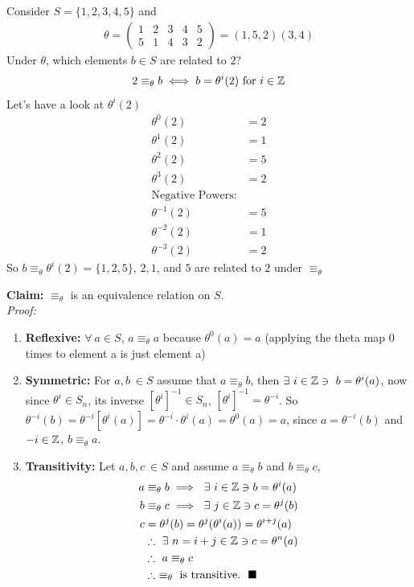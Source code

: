 \begin{example}
Consider $S=\{1,2,3,4,5\}$ and
\begin{align}
    \theta = \begin{pmatrix}
    1&2&3&4&5 \\ 5&1&4&3&2
    \end{pmatrix} = (1,5,2)(3,4)\nonumber
\end{align}
Under $\theta$, which elements $b\in S$ are related to $2$?
\begin{align}
    2\equiv_{\theta} b \iff b=\theta^i(2) \ \text{for } i \in {\mathbb{ Z}} \nonumber
\end{align}
Let's have a look at $\theta^i(2)$
\begin{align}
    \theta^0(2)&=2 \nonumber \\
    \theta^1(2)&=1 \nonumber \\
    \theta^2(2)&=5 \nonumber \\
    \theta^3(2)&=2 \nonumber \\
    \text{Negative Powers:} \nonumber \\
    \theta^{-1}(2)&=5 \nonumber \\
    \theta^{-2}(2)&=1 \nonumber \\
    \theta^{-3}(2)&=2 \nonumber
\end{align}
So $b\equiv_{\theta}\theta^i(2)= \{1,2,5\}$, $2, 1$, and $5$ are related to $2$ under $\equiv_{\theta}$
\end{example}
\textbf{Claim:} $\equiv_{\theta}$ is an equivalence relation on $S$. \\
\textit{Proof:}
\begin{enumerate}
    \item \textbf{Reflexive:} $\forall \ a \in S$, $a\equiv_{\theta} a $ because $\theta^0(a)=a$ (applying the theta map 0 times to element a is just element a)
    \item \textbf{Symmetric:} For $a,b \ \in S$ assume that $a\equiv_{\theta} b$, then $\exists \ i \in \Z \ni \ b=\theta^i(a)$, now since $\theta^i \in S_n$, its inverse $[\theta^i]^{-1}\in S_n$, $[\theta^i]^{-1}=\theta^{-i}$. So $\theta^{-i}(b)= \theta^{-i}[\theta^i(a)] = \theta^{-i}\cdot \theta^i(a)=\theta^0(a)=a$, since $a=\theta^{-i}(b)$ and $-i\in {\mathbb{ Z}}$, $b\equiv_{\theta} a$.
    \item \textbf{Transitivity: }Let $a, b, c \ \in S$ and assume $a\equiv_{\theta} b$ and $b\equiv_{\theta} c$,
    \begin{align}
        a&\equiv_{\theta} b \implies \  \exists \ i \in \Z \ni b= \theta^i(a)\nonumber \\
        b&\equiv_{\theta} c \implies \  \exists \ j \in \Z \ni c= \theta^j(b)\nonumber \\
        c&= \theta^j(b)=\theta^j(\theta^i(a))=\theta^{i+j}(a) \nonumber \\
        &\therefore \ \exists \  n=i+j \in \Z \ni c=\theta^n(a) \nonumber \\
        &\therefore \ a \equiv_{\theta} c \nonumber \\
        &\therefore \ \equiv_{\theta} \text{ is transitive.} \ \ \blacksquare \nonumber
    \end{align}
\end{enumerate}
